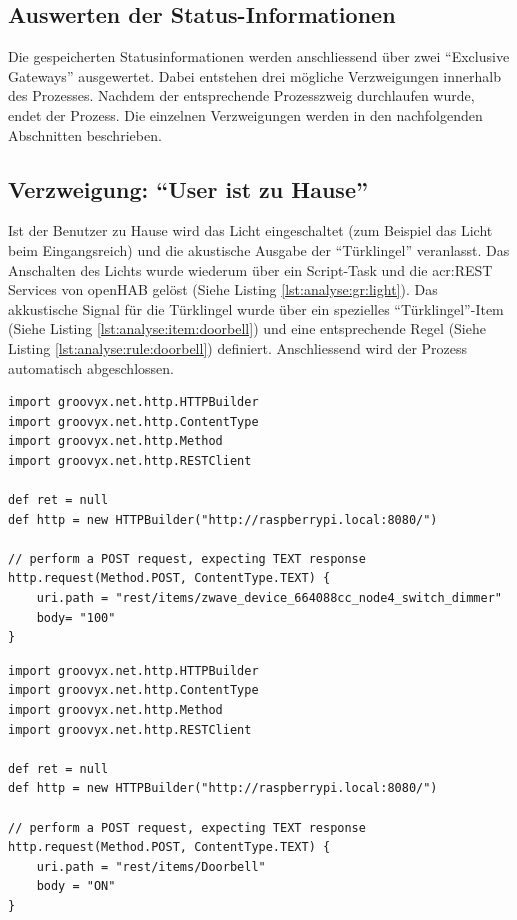 \subsection{Auswerten der Status-Informationen}
Die gespeicherten Statusinformationen werden anschliessend über zwei "`Exclusive Gateways"' ausgewertet. Dabei entstehen drei mögliche Verzweigungen innerhalb des Prozesses.  Nachdem der entsprechende Prozesszweig durchlaufen wurde, endet der Prozess. Die einzelnen Verzweigungen werden in den nachfolgenden Abschnitten beschrieben.

\subsection{Verzweigung: "`User ist zu Hause"'}
Ist der Benutzer zu Hause wird das Licht eingeschaltet (zum Beispiel das Licht beim Eingangsreich) und die akustische Ausgabe der "`Türklingel"' veranlasst. Das Anschalten des Lichts wurde wiederum über ein Script-Task und die \gls{acr:REST} Services von openHAB gelöst (Siehe Listing \ref{lst:analyse:gr:light}). Das akkustische Signal für die Türklingel wurde über ein spezielles "`Türklingel"'-Item (Siehe Listing \ref{lst:analyse:item:doorbell}) und eine entsprechende Regel (Siehe Listing \ref{lst:analyse:rule:doorbell}) definiert. Anschliessend wird der Prozess automatisch abgeschlossen.

\begin{lstlisting}[caption={Groovy-Script zum Einschalten des Lichts},label={lst:analyse:gr:light}] 
import groovyx.net.http.HTTPBuilder
import groovyx.net.http.ContentType
import groovyx.net.http.Method
import groovyx.net.http.RESTClient

def ret = null
def http = new HTTPBuilder("http://raspberrypi.local:8080/")

// perform a POST request, expecting TEXT response
http.request(Method.POST, ContentType.TEXT) {
    uri.path = "rest/items/zwave_device_664088cc_node4_switch_dimmer"
    body= "100"
}
\end{lstlisting}


\begin{lstlisting}[caption={Groovy-Script zum Start der akkustischen "`Türklingel"' Ausgabe}]
import groovyx.net.http.HTTPBuilder
import groovyx.net.http.ContentType
import groovyx.net.http.Method
import groovyx.net.http.RESTClient

def ret = null
def http = new HTTPBuilder("http://raspberrypi.local:8080/")

// perform a POST request, expecting TEXT response
http.request(Method.POST, ContentType.TEXT) {
    uri.path = "rest/items/Doorbell"
    body = "ON"
}
\end{lstlisting}

